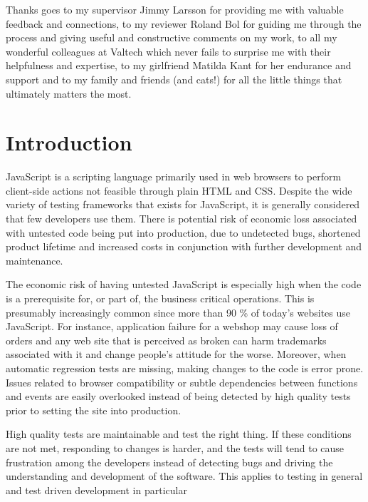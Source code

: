 \documentclass[11pt]{article}
\begin{document}
Thanks goes to my supervisor Jimmy Larsson for providing me with valuable feedback and connections, to my reviewer Roland Bol for guiding me through the process and giving useful and constructive comments on my work, to all my wonderful colleagues at Valtech which never fails to surprise me with their helpfulness and expertise, to my girlfriend Matilda Kant for her endurance and support and to my family and friends (and cats!) for all the little things that ultimately matters the most.

\newpage
\clearpage\mbox{}\clearpage
\newpage

\tableofcontents

\newpage
\clearpage\mbox{}\clearpage
\newpage


\section{Introduction}

JavaScript is a scripting language primarily used in web browsers to perform client-side actions not feasible through plain HTML and CSS. Despite the wide variety of testing frameworks that exists for JavaScript, it is generally considered that few developers use them. There is potential risk of economic loss associated with untested code being put into production, due to undetected bugs, shortened product lifetime and increased costs in conjunction with further development and maintenance.

The economic risk of having untested JavaScript is especially high when the code is a prerequisite for, or part of, the business critical operations. This is presumably increasingly common since more than 90 \% of today's websites use JavaScript\cite{BusinessJavascript}. For instance, application failure for a webshop may cause loss of orders and any web site that is perceived as broken can harm trademarks associated with it and change people's attitude for the worse. Moreover, when automatic regression tests are missing, making changes to the code is error prone. Issues related to browser compatibility or subtle dependencies between functions and events are easily overlooked instead of being detected by high quality tests prior to setting the site into production.

High quality tests are maintainable and test the right thing. If these conditions are not met, responding to changes is harder, and the tests will tend to cause frustration among the developers instead of detecting bugs and driving the understanding and development of the software\cite{Clean}. This applies to testing in general and test driven development in particular
\end{document}
